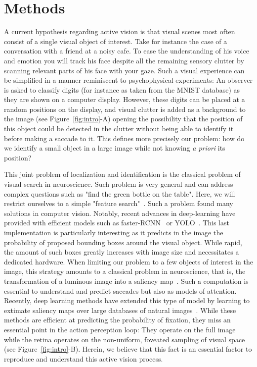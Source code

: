 \section{Methods}

A current hypothesis regarding active vision is that visual scenes most often consist of a single visual object of interest. Take for instance the case of a conversation with a friend at a noisy cafe. To ease the understanding of his voice and emotion you will track his face despite all the remaining sensory clutter by scanning relevant parts of his face with your gaze. Such a visual experience can be simplified in a manner reminiscent to psychophysical experiments: An observer is asked to classify digits (for instance as taken from the MNIST database) as they are shown on a computer display. However, these digits can be placed at a random positions on the display, and visual clutter is added as a background to the image (see Figure~\ref{fig:intro}-A) opening the possibility that the position of this object could be detected in the clutter without being able to identify it before making a saccade to it. This defines more precisely our problem: how do we identify a small object in a large image while not knowing \emph{a priori} its position?

\CNS
This joint problem of localization and identification is the classical problem of visual search in neuroscience. Such problem is very general and can address complex questions such as "find the green bottle on the table". Here, we will restrict ourselves to a simple "feature search"~\citep{Treisman80}. Such a problem found many solutions in computer vision. Notably, recent advances in deep-learning have provided with efficient models such as faster-RCNN~\citep{Ren17} or YOLO~\citep{Redmon15}. This last implementation is particularly interesting as it predicts in the image the probability of proposed bounding boxes around the visual object. While rapid, the amount of such boxes greatly increases with image size and necessitates a dedicated hardware. When limiting our problem to a few objects of interest in the image, this strategy amounts to a classical problem in neuroscience, that is, the transformation of a luminous image into a saliency map~\citep{Itti01}. Such a computation is essential to understand and predict saccades but also as models of attention. Recently, deep learning methods have extended this type of model by learning to extimate saliency maps over large databases of natural images~\citep{Kummerer16}. While these methods are efficient at predicting the probability of fixation, they miss an essential point in the action perception loop: They operate on the full image while the retina operates on the non-uniform, foveated sampling of visual space (see Figure~\ref{fig:intro}-B). Herein, we believe that this fact is an essential factor to reproduce and understand this active vision process.

